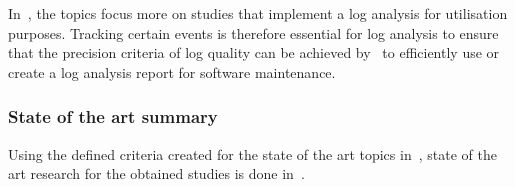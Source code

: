 In~, the topics focus more on studies that implement a log analysis for utilisation purposes. Tracking certain events is therefore essential for log analysis to ensure that the precision criteria of log quality can be achieved by~ to efficiently use or create a log analysis report for software maintenance.

\clearpage

\subsubsection{State of the art summary}
Using the defined criteria created for the state of the art topics in~, state of the art research for the obtained studies is done in~.

\newcommand{\sotaCore}{\rowcolor{lightgray}
\cite{Ogheneovo2014} & Partial & \cmark & \cmark & \xmark & \xmark & \xmark \\
\cite{Tang2010} & Partial & Partial & \cmark & \xmark & \xmark & \xmark \\
\rowcolor{lightgray}
\cite{Sneed2004} & Partial & \cmark & \cmark & \xmark & \xmark & \xmark \\
\cite{Stojanov2017} & \xmark & \cmark & \cmark & \xmark & \xmark & \xmark \\
\rowcolor{lightgray}
\cite{Galster2019} & \cmark & Partial & \xmark & \xmark & \xmark & \xmark \\
\cite{Lenarduzzi2017} & Partial & \cmark & \cmark & \xmark & \xmark & \xmark \\
\rowcolor{lightgray}
\cite{Araujo2021} & Partial & \xmark & \cmark & \xmark & \xmark & \xmark \\	
\cite{Zhu2019} & \xmark & \xmark & \xmark & \cmark & Partial & \xmark \\
\rowcolor{lightgray}
\cite{Bogatinovski2023} & \xmark & \xmark & \xmark & \cmark & \cmark & \cmark \\
\cite{Rong2018} & \xmark & \xmark & \xmark & Partial & Partial & \xmark \\
\rowcolor{lightgray}
\cite{Zhu2015} & \xmark & \xmark & \xmark & \cmark & \cmark & \xmark \\
\cite{Kherbouche2017} & \xmark & \xmark & \xmark & Partial & Partial & \xmark \\
\rowcolor{lightgray}
\cite{Hasiloglu2018} & \xmark & \xmark & \xmark & \cmark & \cmark & Partial \\
\cite{Slaninova2014} & \xmark & \xmark & \xmark & \cmark & \cmark & Partial \\
\rowcolor{lightgray}
\cite{Waqar2017} & \xmark & \xmark & \xmark & \xmark & \xmark & \cmark \\
\cite{Kumar2017} & \xmark & \xmark & \xmark & \xmark & \xmark & \cmark \\
}

